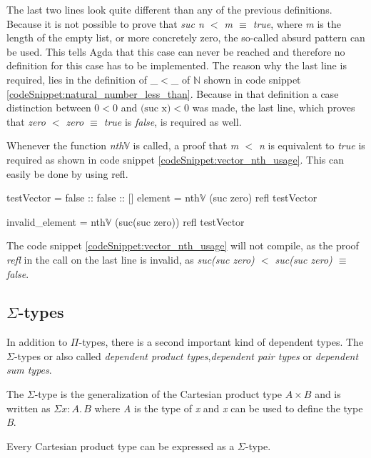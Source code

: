 The last two lines look quite different than any of the previous definitions.
Because it is not possible to prove that \emph{suc n $<$ m $\equiv$ true}, where \emph{m} is the length of the empty list, or more concretely zero, the so-called absurd pattern can be used. 
This tells Agda that this case can never be reached and therefore no definition for this case has to be implemented.
The reason why the last line is required, lies in the definition of \_$<$\_ of $\mathbb{N}$ shown in code snippet \ref{codeSnippet:natural_number_less_than}.
Because in that definition a case distinction between $0 < 0$ and $\text{(suc x)} < 0$ was made, the last line, which proves that \emph{zero $<$ zero $\equiv$ true} is \emph{false}, is required as well.

Whenever the function \emph{nth$\mathbb{V}$} is called, a proof that \emph{m $<$ n} is equivalent to \emph{true} is required as shown in code snippet \ref{codeSnippet:vector_nth_usage}. This can easily be done by using refl.

\begin{codesnippet}[mathescape=true, caption={Usage of \emph{nth} function in Agda}, label={codeSnippet:vector_nth_usage}]
testVector = false :: false :: []
element = nth$\mathbb{V}$ (suc zero) refl testVector

invalid_element = nth$\mathbb{V}$ (suc(suc zero)) 
                  refl testVector
\end{codesnippet}

The code snippet \ref{codeSnippet:vector_nth_usage} will not compile, as the proof \emph{refl} in the call on the last line is invalid, as \emph{suc(suc zero) $<$ suc(suc zero) $\equiv$ false}.

\subsection{$\Sigma$-types}
In addition to $\Pi$-types, there is a second important kind of dependent types. 
The $\Sigma$-types or also called \emph{dependent product types}\cite{10.1145/2841316},\emph{dependent pair types}\cite{10.1145/2841316} or \emph{dependent sum types}\cite{10.5555/1076265}.

The $\Sigma$-type is the generalization of the Cartesian product type $A \times B$ and is written as $\Sigma x:A. \, B$ where \emph{A} is the type of \emph{x} and \emph{x} can be used to define the type \emph{B}.

Every Cartesian product type can be expressed as a $\Sigma$-type.

